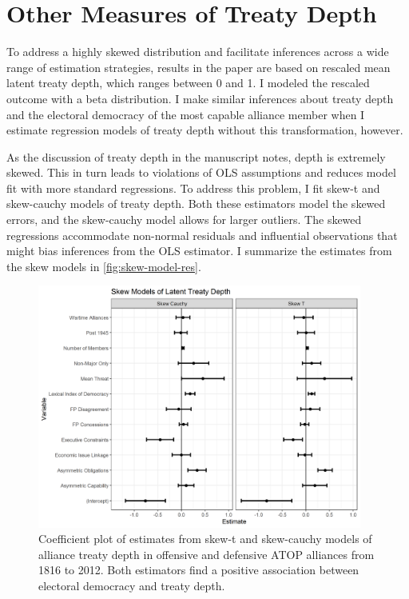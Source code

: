 \documentclass[12pt]{article}
\begin{document}
\section{Other Measures of Treaty Depth}



To address a highly skewed distribution and facilitate inferences across a wide range of estimation strategies, results in the paper are based on rescaled mean latent treaty depth, which ranges between 0 and 1. 
I modeled the rescaled outcome with a beta distribution. 
I make similar inferences about treaty depth and the electoral democracy of the most capable alliance member when I estimate regression models of treaty depth without this transformation, however. 


As the discussion of treaty depth in the manuscript notes, depth is extremely skewed. 
This in turn leads to violations of OLS assumptions and reduces model fit with more standard regressions. 
To address this problem, I fit skew-t and skew-cauchy models of treaty depth.
Both these estimators model the skewed errors, and the skew-cauchy model allows for larger outliers.   
The skewed regressions accommodate non-normal residuals and influential observations that might bias inferences from the OLS estimator. 
I summarize the estimates from the skew models in \autoref{fig:skew-model-res}. 


\begin{figure}[htbp]
	\centering
		\includegraphics[width=0.95\textwidth]{skew-model-res.png}
	\caption{Coefficient plot of estimates from skew-t and skew-cauchy models of alliance treaty depth in offensive and defensive ATOP alliances from 1816 to 2012. Both estimators find a positive association between electoral democracy and treaty depth.}
	\label{fig:skew-model-res}
\end{figure} 
\end{document}
